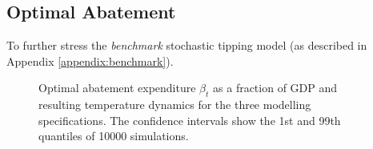 \documentclass[../../main.tex]{subfiles}
\begin{document}
\subsection{Optimal Abatement} \label{section:abatement}

To further stress the  \textit{benchmark} stochastic tipping model (as described in Appendix \ref{appendix:benchmark}).

\begin{figure}[H]
    \centering
    
    \caption{Optimal abatement expenditure $\beta_t$ as a fraction of GDP and resulting temperature dynamics for the three modelling specifications. The confidence intervals show the 1st and 99th quantiles of 10000 simulations.}
    \label{fig:trajectory}
\end{figure}
\end{document}
